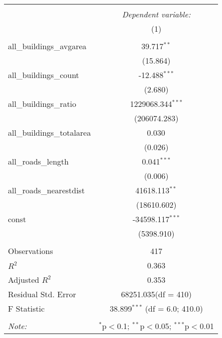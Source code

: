 \begin{table}[!htbp] \centering
\begin{tabular}{@{\extracolsep{5pt}}lc}
\\[-1.8ex]\hline
\hline \\[-1.8ex]
& \multicolumn{1}{c}{\textit{Dependent variable:}} \
\cr \cline{1-2}
\\[-1.8ex] & (1) \\
\hline \\[-1.8ex]
 all_buildings_avgarea & 39.717$^{**}$ \\
  & (15.864) \\
 all_buildings_count & -12.488$^{***}$ \\
  & (2.680) \\
 all_buildings_ratio & 1229068.344$^{***}$ \\
  & (206074.283) \\
 all_buildings_totalarea & 0.030$^{}$ \\
  & (0.026) \\
 all_roads_length & 0.041$^{***}$ \\
  & (0.006) \\
 all_roads_nearestdist & 41618.113$^{**}$ \\
  & (18610.602) \\
 const & -34598.117$^{***}$ \\
  & (5398.910) \\
\hline \\[-1.8ex]
 Observations & 417 \\
 $R^2$ & 0.363 \\
 Adjusted $R^2$ & 0.353 \\
 Residual Std. Error & 68251.035(df = 410)  \\
 F Statistic & 38.899$^{***}$ (df = 6.0; 410.0) \\
\hline
\hline \\[-1.8ex]
\textit{Note:} & \multicolumn{1}{r}{$^{*}$p$<$0.1; $^{**}$p$<$0.05; $^{***}$p$<$0.01} \\
\end{tabular}
\end{table}